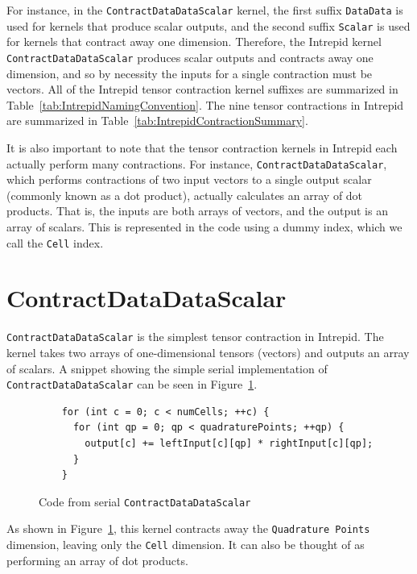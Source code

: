 For instance, in the \texttt{ContractDataDataScalar} kernel, the first suffix
\texttt{DataData} is used for kernels that produce scalar outputs, and the
second suffix \texttt{Scalar} is used for kernels that contract away one
dimension. Therefore, the Intrepid kernel \texttt{ContractDataDataScalar}
produces scalar outputs and contracts away one dimension, and so by necessity
the inputs for a single contraction must be vectors. All of the Intrepid tensor
contraction kernel suffixes are summarized in
Table~\ref{tab:IntrepidNamingConvention}. The nine tensor contractions in
Intrepid are summarized in Table~\ref{tab:IntrepidContractionSummary}.

It is also important to note that the tensor contraction kernels in Intrepid each actually perform many
contractions. For instance, \texttt{ContractDataDataScalar}, which performs
contractions of two input vectors to a single output scalar (commonly known as a dot product),
actually calculates an array of dot products. That is, the inputs are both
arrays of vectors, and the output is an array of scalars. This is represented
in the code using a dummy index, which we call the \texttt{Cell} index.

\section{ContractDataDataScalar}
\texttt{ContractDataDataScalar} is the simplest tensor contraction in Intrepid.
The kernel takes two arrays of one-dimensional tensors (vectors) and outputs an array of scalars. A
snippet showing the simple serial implementation of
\texttt{ContractDataDataScalar} can be seen in
Figure~\ref{lst:ContractDataDataScalarSerial}.

\begin{figure}[ht]
    \begin{lstlisting}
    for (int c = 0; c < numCells; ++c) {
      for (int qp = 0; qp < quadraturePoints; ++qp) {
        output[c] += leftInput[c][qp] * rightInput[c][qp];
      }
    }
    \end{lstlisting}
\caption{Code from serial \texttt{ContractDataDataScalar}
\label{lst:ContractDataDataScalarSerial}} 
\end{figure}

As shown in 
Figure~\ref{lst:ContractDataDataScalarSerial}, this kernel contracts away the
\texttt{Quadrature Points} dimension, leaving only the \texttt{Cell} dimension.
It can also be thought of as performing an array of dot products.

